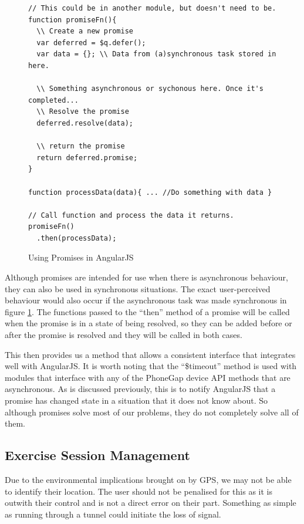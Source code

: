 \begin{figure}[h]
\begin{verbatim}
// This could be in another module, but doesn't need to be.
function promiseFn(){
  \\ Create a new promise
  var deferred = $q.defer();
  var data = {}; \\ Data from (a)synchronous task stored in here.  

  \\ Something asynchronous or sychonous here. Once it's completed...
  \\ Resolve the promise
  deferred.resolve(data);

  \\ return the promise
  return deferred.promise;
}

function processData(data){ ... //Do something with data }

// Call function and process the data it returns.
promiseFn()
  .then(processData);
\end{verbatim}
\caption{Using Promises in AngularJS}
\label{fig:promises}
\end{figure}

Although promises are intended for use when there is asynchronous
behaviour, they can also be used in synchronous situations. The exact
user-perceived behaviour would also occur if the asynchronous task was
made synchronous in figure \ref{fig:promises}. The functions passed to
the ``then'' method of a promise will be called when the promise is in
a state of being resolved, so they can be added before or after the
promise is resolved and they will be called in both cases.

This then provides us a method that allows a consistent interface that
integrates well with AngularJS. It is worth noting that the
``\$timeout'' method is used with modules that interface with any of
the PhoneGap device API methods that are asynchronous. As is discussed
previously, this is to notify AngularJS that a promise has changed
state in a situation that it does not know about. So although promises
solve most of our problems, they do not completely solve all of them.

\subsection{Exercise Session Management}
\label{sec:session_mgmt}
Due to the environmental implications brought on by GPS, we may not be
able to identify their location. The user should not
be penalised for this as it is outwith their control and is not a
direct error on their part. Something as simple as running through a
tunnel could initiate the loss of signal. 

